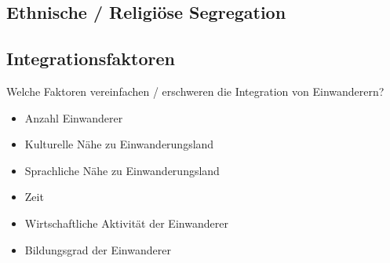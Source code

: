 \subsection{Ethnische / Religiöse Segregation}

\subsection{Integrationsfaktoren}
\begin{myexercise}
Welche Faktoren vereinfachen / erschweren die Integration von Einwanderern?

\begin{myanswer}
\begin{itemize}
\item Anzahl Einwanderer
\item Kulturelle Nähe zu Einwanderungsland
\item Sprachliche Nähe zu Einwanderungsland
\item Zeit
\item Wirtschaftliche Aktivität der Einwanderer
\item Bildungsgrad der Einwanderer
\end{itemize}
\end{myanswer}
\end{myexercise}


